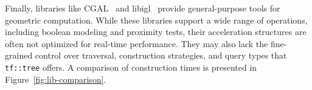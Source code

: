 Finally, libraries like CGAL~\cite{cgal} and libigl~\cite{libigl}
provide general-purpose tools for geometric computation. While
these libraries support a wide range of operations, including
boolean modeling and proximity tests, their acceleration structures
are often not optimized for real-time performance. They may also lack
the fine-grained control over traversal, construction strategies,
and query types that \texttt{tf::tree} offers. A comparison of
construction times is presented in Figure~\ref{fig:lib-comparison}.
